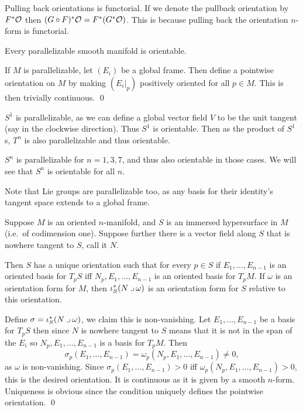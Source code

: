 \eproof

Pulling back orientations is functorial.
If we denote the pullback orientation by $F^*{{\cal O}}$ then $(G\circ F)^*{{\cal O}}=F^*(G^*{{\cal O}})$.
This is because pulling back the orientation $n$-form is functorial.

\bprop

    Every parallelizable smooth manifold is orientable.

\eprop

\bproof

    If $M$ is parallelizable, let $(E_i)$ be a global frame.
    Then define a pointwise orientation on $M$ by making $(E_i|_p)$ positively oriented for all $p\in M$.
    This is then trivially continuous.
    \qed

\eproof

\bexam

    $S^1$ is parallelizable, as we can define a global vector field $V$ to be the unit tangent (say in the clockwise direction).
    Thus $S^1$ is orientable.
    Then as the product of $S^1$s, $T^n$ is also parallelizable and thus orientable.

    $S^n$ is parallelizable for $n=1,3,7$, and thus also orientable in those cases.
    We will see that $S^n$ is orientable for all $n$.

    Note that Lie groups are parallelizable too, as any basis for their identity's tangent space extends to a global frame.

\eexam

\bprop

    Suppose $M$ is an oriented $n$-manifold, and $S$ is an immersed hypersurface in $M$ (i.e.\ of codimension one).
    Suppose further there is a vector field along $S$ that is nowhere tangent to $S$, call it $N$.

    Then $S$ has a unique orientation such that for every $p\in S$ if $E_1,\dots,E_{n-1}$ is an oriented basis for $T_pS$
    iff $N_p,E_1,\dots,E_{n-1}$ is an oriented basis for $T_pM$.
    If $\omega$ is an orientation form for $M$, then $\iota^*_S(N\imult\omega)$ is an orientation form for $S$ relative
    to this orientation.

\eprop

\bproof

    Define $\sigma=\iota_S^*(N\imult\omega)$, we claim this is non-vanishing.
    Let $E_1,\dots,E_{n-1}$ be a basis for $T_pS$ then since $N$ is nowhere tangent to $S$ means that it is not in the
    span of the $E_i$ so $N_p,E_1,\dots,E_{n-1}$ is a basis for $T_pM$.
    Then
    $$ \sigma_p(E_1,\dots,E_{n-1}) = \omega_p(N_p,E_1,\dots,E_{n-1}) \neq 0 , $$
    as $\omega$ is non-vanishing.
    Since $\sigma_p(E_1,\dots,E_{n-1})>0$ iff $\omega_p(N_p,E_1,\dots,E_{n-1})>0$, this is the desired orientation.
    It is continuous as it is given by a smooth $n$-form.
    Uniqueness is obvious since the condition uniquely defines the pointwise orientation.
    \qed

